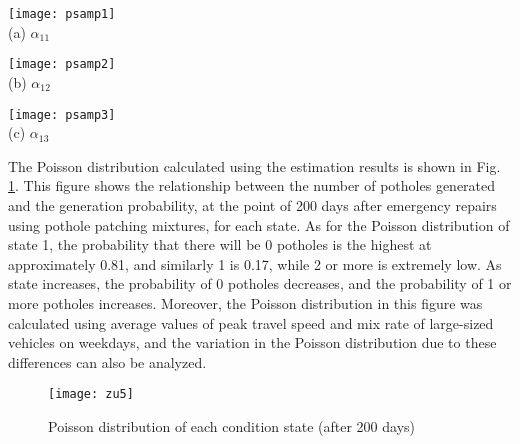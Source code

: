 \documentclass[Journal]{ascelike}
\begin{document}
\begin{figure*}[t]
\vspace{5mm}
\begin{center}
\begin{minipage}{1.0\textwidth}
\begin{center}
   \begin{minipage}{0.3\textwidth}
   \begin{center}
   \texttt{[image: psamp1]}\\
   (a) $\alpha_{11}$
   \end{center}
   \end{minipage}
   \begin{minipage}{0.3\textwidth}
   \begin{center}
   \texttt{[image: psamp2]}\\
   (b) $\alpha_{12}$
   \end{center}
   \end{minipage}
   \begin{minipage}{0.3\textwidth}
   \begin{center}
   \texttt{[image: psamp3]}\\
   (c) $\alpha_{13}$
   \end{center}
   \end{minipage}
\end{center}
\end{minipage}
\caption{Sampling results $\alpha$}
\label{jciz5}
\end{center}
\vspace{-5mm}
\end{figure*}
%
The Poisson distribution calculated using the estimation results is shown in Fig. \ref{4poi1}. This figure shows the relationship between the number of potholes generated and the generation probability, at the point of 200 days after emergency repairs using pothole patching mixtures, for each state. As for the Poisson distribution of  state 1, the probability that there will be 0 potholes is the highest at approximately 0.81, and similarly 1 is 0.17, while 2 or more is extremely low. As state increases, the probability of 0 potholes decreases, and the probability of 1 or more potholes increases. Moreover, the Poisson distribution in this figure was calculated using average values of peak travel speed and mix rate of large-sized vehicles on weekdays, and the variation in the Poisson distribution due to these differences can also be analyzed.
%
%
\begin{figure}[t]
\centering
\texttt{[image: zu5]}\\
\caption{Poisson distribution of each condition state (after 200 days)}
\label{4poi1}
\end{figure}
\end{document}
